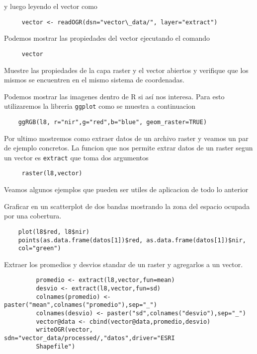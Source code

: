 y luego leyendo el vector como

\begin{lstlisting}
     vector <- readOGR(dsn="vector\_data/", layer="extract")
\end{lstlisting}

Podemos mostrar las propiedades del vector ejecutando el comando

\begin{lstlisting}
     vector
\end{lstlisting}

\begin{act} 
    Muestre las propiedades de la capa raster y el vector abiertos y verifique
    que los mismos se encuentren en el mismo sistema de coordenadas.
\end{act}

Podemos mostrar las imagenes dentro de R si así nos interesa. Para esto
utilizaremos la libreria \texttt{ggplot} como se muestra a continuacion

 \begin{lstlisting}
    ggRGB(l8, r="nir",g="red",b="blue", geom_raster=TRUE) 
 \end{lstlisting}

Por ultimo mostremos como extraer datos de un archivo raster y veamos un par de
ejemplo concretos. La funcion que nos permite extrar datos de un raster segun
un vector es \texttt{extract} que toma dos argumentos
 \begin{lstlisting}
     raster(l8,vector)
 \end{lstlisting}

Veamos algunos ejemplos que pueden ser utiles de aplicacion de todo lo anterior

\begin{exa}
    Graficar en un scatterplot de dos bandas mostrando la zona del espacio 
    ocupada por una cobertura.
 \begin{lstlisting}
    plot(l8$red, l8$nir)
    points(as.data.frame(datos[1])$red, as.data.frame(datos[1])$nir,
    col="green")
 \end{lstlisting}
\end{exa}

\begin{exa}
     Extraer los promedios y desvios standar de un raster y agregarlos a un
     vector.
     \begin{lstlisting}
         promedio <- extract(l8,vector,fun=mean)
         desvio <- extract(l8,vector,fun=sd)
         colnames(promedio) <- paster("mean",colnames("promedio"),sep="_")
         colnames(desvio) <- paster("sd",colnames("desvio"),sep="_")
         vector@data <- cbind(vector@data,promedio,desvio)
         writeOGR(vector, sdn="vector_data/processed/,"datos",driver="ESRI
         Shapefile")
     \end{lstlisting}
\end{exa}


